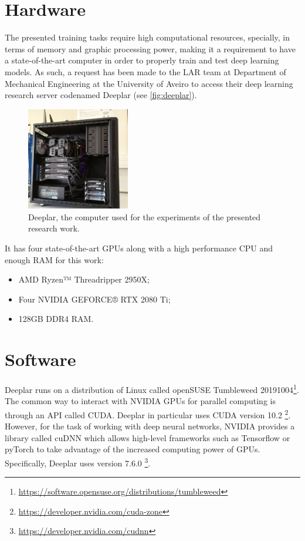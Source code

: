 \section{Hardware}
\label{section:hardware}
    The presented training tasks require high computational resources, specially, in terms of memory and graphic processing power, making it a requirement to have a state-of-the-art computer in order to properly train and test deep learning models. As such, a request has been made to the \ac{LAR} team at Department of Mechanical Engineering at the University of Aveiro to access their deep learning research server codenamed Deeplar (see \autoref{fig:deeplar}). 
    
    \begin{figure}[ht]
        \centering
        \includegraphics[width=0.4\textwidth]{figs/deeplar.jpg}
        \caption{Deeplar, the computer used for the experiments of the presented research work.}
        \label{fig:deeplar}
    \end{figure}
    
    It has four state-of-the-art \ac{GPU}s along with a high performance \ac{CPU} and enough \ac{RAM} for this work:
    
    \begin{itemize}
        \item AMD Ryzen™ Threadripper 2950X;
        \item Four NVIDIA GEFORCE® RTX 2080 Ti;
        \item 128GB DDR4 RAM.
    \end{itemize}

\section{Software}
\label{section:software}

    Deeplar runs on a distribution of Linux called openSUSE Tumbleweed 20191004\footnote{\url{https://software.opensuse.org/distributions/tumbleweed}}. The common way to interact with NVIDIA GPUs for parallel computing is through an API called CUDA. Deeplar in particular uses CUDA version 10.2 \footnote{\url{https://developer.nvidia.com/cuda-zone}}. However, for the task of working with deep neural networks, NVIDIA provides a library called cuDNN which allows high-level frameworks such as Tensorflow or pyTorch to take advantage of the increased computing power of GPUs. Specifically, Deeplar uses version 7.6.0 \footnote{\url{https://developer.nvidia.com/cudnn}}.
    
